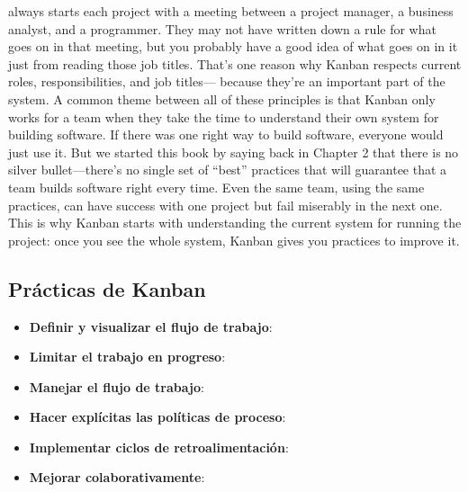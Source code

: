 \begin{itemize}
always starts each project
with a meeting between a project manager, a business analyst, and a programmer.
They may not have written down a rule for what goes on in that meeting, but you
probably have a good idea of what goes on in it just from reading those job titles.
That's one reason why Kanban respects current roles, responsibilities, and job titles—
because they're an important part of the system.
A common theme between all of these principles is that Kanban only works for a
team when they take the time to understand their own system for building software.
If there was one right way to build software, everyone would just use it. But we
started this book by saying back in Chapter 2 that there is no silver bullet—there's no
single set of “best” practices that will guarantee that a team builds software right every
time. Even the same team, using the same practices, can have success with one project
but fail miserably in the next one. This is why Kanban starts with understanding the
current system for running the project: once you see the whole system, Kanban gives
you practices to improve it.
\end{itemize}

\subsection{Prácticas de Kanban}


\begin{itemize}
    \item \textbf{Definir y visualizar el flujo de trabajo}: %
    \item \textbf{Limitar el trabajo en progreso}: %
    \item \textbf{Manejar el flujo de trabajo}: %
    \item \textbf{Hacer explícitas las políticas de proceso}: %
    \item \textbf{Implementar ciclos de retroalimentación}: %
    \item \textbf{Mejorar colaborativamente}: %
\end{itemize}

